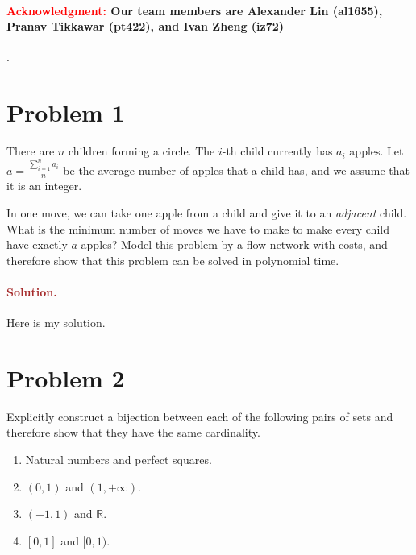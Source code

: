 \paragraph{\textcolor{red}{Acknowledgment:} Our team members are \textbf{Alexander Lin (al1655)}, \textbf{Pranav Tikkawar (pt422)}, and \textbf{Ivan Zheng (iz72)}}.


\section*{Problem 1}
There are $n$ children forming a circle. The $i$-th child currently has $a_i$ apples. Let $\bar a = \frac{\sum_{i = 1}^n a_i}{n}$ be the average number of apples that a child has, and we assume that it is an integer.

In one move, we can take one apple from a child and give it to an \emph{adjacent} child. What is the minimum number of moves we have to make to make every child have exactly $\bar a$ apples? Model this problem by a flow network with costs, and therefore show that this problem can be solved in polynomial time.

\paragraph{\textcolor{brown}{Solution.}}
Here is my solution.


\section*{Problem 2}
Explicitly construct a bijection between each of the following pairs of sets and therefore show that they have the same cardinality.
\begin{enumerate}
    \item Natural numbers and perfect squares.
    \item $(0, 1)$ and $(1, +\infty)$.
    \item $(-1, 1)$ and $\mathbb{R}$.
    \item $[0, 1]$ and $[0, 1)$.
\end{enumerate}


